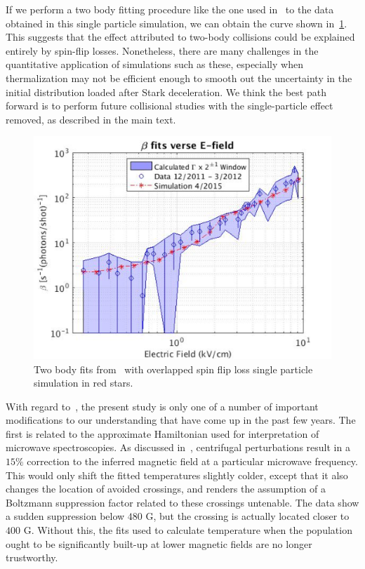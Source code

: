\documentclass[%
 reprint,
 amsmath,amssymb,
 aps,
prl,
]{revtex4-1}
\begin{document}
If we perform a two body fitting procedure like the one used in~\cite{Stuhl2013} to the data obtained in this single particle simulation, we can obtain the curve shown in~\ref{fig:beta}. 
This suggests that the effect attributed to two-body collisions could be explained entirely by spin-flip losses.
Nonetheless, there are many challenges in the quantitative application of simulations such as these, especially when thermalization may not be efficient enough to smooth out the uncertainty in the initial distribution loaded after Stark deceleration.
We think the best path forward is to perform future collisional studies with the single-particle effect removed, as described in the main text.

\begin{figure}[tb]
\includegraphics[width=\linewidth]{SuppFigs/Beta.png}%
\caption{
Two body fits from~\cite{Stuhl2013} with overlapped spin flip loss single particle simulation in red stars.
}
\label{fig:beta}
\end{figure}

With regard to~\cite{Stuhl2012evap}, the present study is only one of a number of important modifications to our understanding that have come up in the past few years. The first is related to the approximate Hamiltonian used for interpretation of microwave spectroscopies. As discussed in~\cite{Maeda2015}, centrifugal perturbations result in a $15\%$ correction to the inferred magnetic field at a particular microwave frequency. This would only shift the fitted temperatures slightly colder, except that it also changes the location of avoided crossings, and renders the assumption of a Boltzmann suppression factor related to these crossings untenable. The data show a sudden suppression below $480\text{ G}$, but the crossing is actually located closer to $400\text{ G}$. Without this, the fits used to calculate temperature when the population ought to be significantly built-up at lower magnetic fields are no longer trustworthy. 
\end{document}
